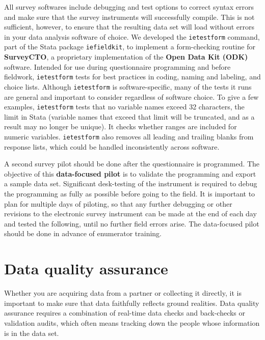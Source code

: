 All survey softwares include debugging and test options
to correct syntax errors and make sure that the survey instruments will successfully compile.
This is not sufficient, however, to ensure that the resulting data set
will load without errors in your data analysis software of choice.
We developed the \texttt{ietestform} command,
part of the Stata package \texttt{iefieldkit},
to implement a form-checking routine for \textbf{SurveyCTO},
a proprietary implementation of the \textbf{Open Data Kit (ODK)} software.
Intended for use during questionnaire programming and before fieldwork,
\texttt{ietestform} tests for best practices in coding, naming and labeling, and choice lists.
Although \texttt{ietestform} is software-specific,
many of the tests it runs are general and important to consider regardless of software choice.
To give a few examples, \texttt{ietestform} tests that no variable names exceed
32 characters, the limit in Stata (variable names that exceed that limit will
be truncated, and as a result may no longer be unique).
It checks whether ranges are included for numeric variables.
\texttt{ietestform} also removes all leading and trailing blanks from response lists,
which could be handled inconsistently across software.

A second survey pilot should be done after the questionnaire is programmed.
The objective of this \textbf{data-focused pilot}
is to validate the programming and export a sample data set.
Significant desk-testing of the instrument is required to debug the programming
as fully as possible before going to the field.
It is important to plan for multiple days of piloting,
so that any further debugging or other revisions to the electronic survey instrument
can be made at the end of each day and tested the following, until no further field errors arise.
The data-focused pilot should be done in advance of enumerator training.

\section{Data quality assurance}

Whether you are acquiring data from a partner or collecting it directly,
it is important to make sure that data faithfully reflects ground realities.
Data quality assurance requires a combination of real-time data checks
and back-checks or validation audits, which often means tracking down
the people whose information is in the data set.

